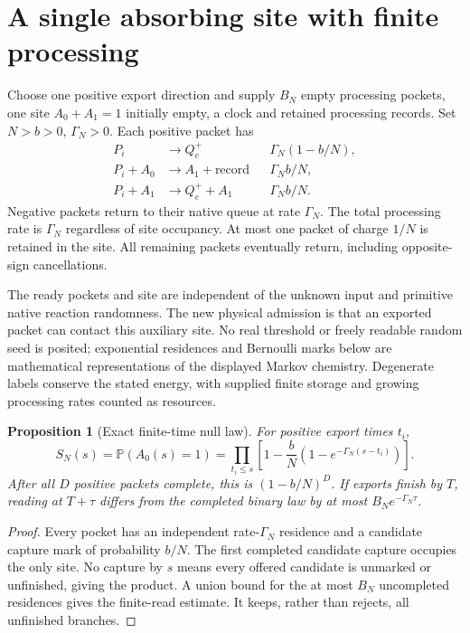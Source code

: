 \documentclass[11pt,oneside,openany]{book}
\newtheorem{proposition}[theorem]{Proposition}
\theoremstyle{definition}
\theoremstyle{remark}\newtheorem{remark}[theorem]{Remark}
\begin{document}
\section{A single absorbing site with finite processing}
Choose one positive export direction and supply $B_N$ empty processing
pockets, one site $A_0+A_1=1$ initially empty, a clock and retained
processing records. Set $N>b>0$, $\Gamma_N>0$. Each positive packet has
\begin{align}
 P_i&\longrightarrow Q_e^+ &&\Gamma_N(1-b/N),\nonumber\\
 P_i+A_0&\longrightarrow A_1+\text{record}
 &&\Gamma_Nb/N,\label{acc:pocket}\\
 P_i+A_1&\longrightarrow Q_e^++A_1 &&\Gamma_Nb/N.\nonumber
\end{align}
Negative packets return to their native queue at rate $\Gamma_N$.
The total processing rate is $\Gamma_N$ regardless of site occupancy.
At most one packet of charge $1/N$ is retained in the site. All remaining
packets eventually return, including opposite-sign cancellations.

The ready pockets and site are independent of the unknown input and
primitive native reaction randomness. The new physical admission is that
an exported packet can contact this auxiliary site. No real threshold or
freely readable random seed is posited; exponential residences and
Bernoulli marks below are mathematical representations of the displayed
Markov chemistry. Degenerate labels conserve the stated energy, with
supplied finite storage and growing processing rates counted as resources.

\begin{proposition}[Exact finite-time null law]\label{acc:pocketnull}
For positive export times $t_i$,
\begin{equation}
 S_N(s)=\mathbb P(A_0(s)=1)=
 \prod_{t_i\le s}\left[1-\frac bN
 (1-e^{-\Gamma_N(s-t_i)})\right].
 \label{acc:nullproduct}
\end{equation}
After all $D$ positive packets complete, this is $(1-b/N)^D$.
If exports finish by $T$, reading at $T+\tau$ differs from the completed
binary law by at most $B_Ne^{-\Gamma_N\tau}$.
\end{proposition}
\begin{proof}
Every pocket has an independent rate-$\Gamma_N$ residence and a candidate
capture mark of probability $b/N$. The first completed candidate capture
occupies the only site. No capture by $s$ means every offered candidate is
unmarked or unfinished, giving the product. A union bound for the at most
$B_N$ uncompleted residences gives the finite-read estimate. It keeps,
rather than rejects, all unfinished branches.
\end{proof}
\end{document}
